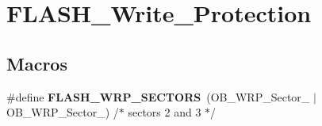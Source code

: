 \hypertarget{group___f_l_a_s_h___write___protection}{\section{F\-L\-A\-S\-H\-\_\-\-Write\-\_\-\-Protection}
\label{group___f_l_a_s_h___write___protection}
}
\subsection*{Macros}
\begin{DoxyCompactItemize}
\item 
\hypertarget{group___f_l_a_s_h___write___protection_gaa4a4b30d966fd9ac429a766cce7a6fc3}{\#define {\bfseries F\-L\-A\-S\-H\-\_\-\-W\-R\-P\-\_\-\-S\-E\-C\-T\-O\-R\-S}~(O\-B\-\_\-\-W\-R\-P\-\_\-\-Sector\-\_ $|$ O\-B\-\_\-\-W\-R\-P\-\_\-\-Sector\-\_) /$\ast$ sectors 2 and 3  $\ast$/}\label{group___f_l_a_s_h___write___protection_gaa4a4b30d966fd9ac429a766cce7a6fc3}

\end{DoxyCompactItemize}
